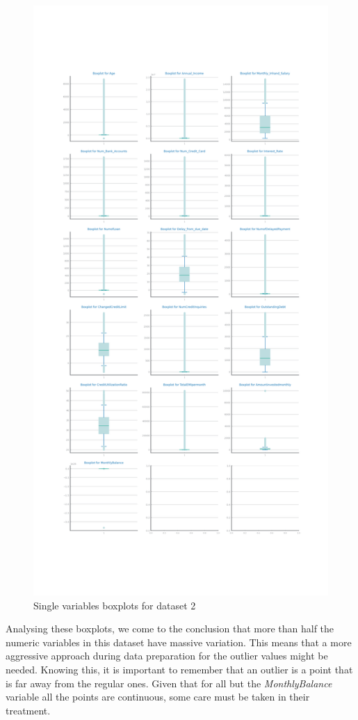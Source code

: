\documentclass[10pt]{extarticle}
\begin{document}
\begin{figure}[H]
\centering\includegraphics[scale=0.6]{images/dataset2/data_profiling/Credit_Score_single_boxplots.png}
\caption{Single variables boxplots for dataset 2}
\end{figure}
Analysing these boxplots, we come to the conclusion that more than half the numeric variables in this dataset have massive variation.
This means that a more aggressive approach during data preparation for the outlier values might be needed. Knowing this, it is important
to remember that an outlier is a point that is far away from the regular ones. Given that for all but the \textit{MonthlyBalance} 
variable all the points are continuous, some care must be taken in their treatment.
\end{document}
